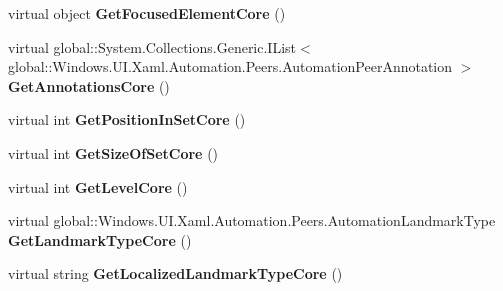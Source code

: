 \begin{DoxyCompactItemize}
virtual object {\bfseries Get\+Focused\+Element\+Core} ()
\item 
\mbox{\label{class_windows_1_1_u_i_1_1_xaml_1_1_automation_1_1_peers_1_1_automation_peer_ab6f0d05047a23ceac4c1969ba5a531c6}} 
virtual global\+::\+System.\+Collections.\+Generic.\+I\+List$<$ global\+::\+Windows.\+U\+I.\+Xaml.\+Automation.\+Peers.\+Automation\+Peer\+Annotation $>$ {\bfseries Get\+Annotations\+Core} ()
\item 
\mbox{\label{class_windows_1_1_u_i_1_1_xaml_1_1_automation_1_1_peers_1_1_automation_peer_a1bcb3ef7e7391852a768d6874d898f73}} 
virtual int {\bfseries Get\+Position\+In\+Set\+Core} ()
\item 
\mbox{\label{class_windows_1_1_u_i_1_1_xaml_1_1_automation_1_1_peers_1_1_automation_peer_a4f2274f1bbafc48d35ae4a1baaf68144}} 
virtual int {\bfseries Get\+Size\+Of\+Set\+Core} ()
\item 
\mbox{\label{class_windows_1_1_u_i_1_1_xaml_1_1_automation_1_1_peers_1_1_automation_peer_aa68b2502b978bd14d3692f0943c7ebe2}} 
virtual int {\bfseries Get\+Level\+Core} ()
\item 
\mbox{\label{class_windows_1_1_u_i_1_1_xaml_1_1_automation_1_1_peers_1_1_automation_peer_a16b5c59f62d9cfb375b06085b3ebface}} 
virtual global\+::\+Windows.\+U\+I.\+Xaml.\+Automation.\+Peers.\+Automation\+Landmark\+Type {\bfseries Get\+Landmark\+Type\+Core} ()
\item 
\mbox{\label{class_windows_1_1_u_i_1_1_xaml_1_1_automation_1_1_peers_1_1_automation_peer_a81ded2ee8cb403207b5438e524931e09}} 
virtual string {\bfseries Get\+Localized\+Landmark\+Type\+Core} ()
\item 
\mbox{\label{class_windows_1_1_u_i_1_1_xaml_1_1_automation_1_1_peers_1_1_automation_peer_a5868d299d4d9698f50f5f3af851f85d2}} 

\end{DoxyCompactItemize}
